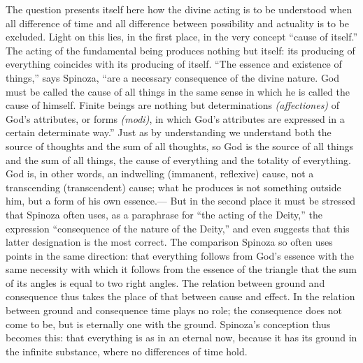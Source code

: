 \documentclass[12pt]{book}
\newcommand{\opage}[1]{\marginnote{\footnotesize\textit{[#1]}}}
\begin{document}
The question presents itself here how the divine acting is to be understood when all
difference of time and all difference between possibility and actuality is to be
excluded. Light on this lies, in the first place, in the very concept ``cause of
itself.'' The acting of the fundamental being produces nothing but itself: its
producing of everything coincides with its producing of itself. ``The essence and
existence of things,'' says Spinoza, ``are a necessary consequence of the divine nature.
God must be called the cause of all things in the same sense in which he is called the
cause of himself. Finite beings are nothing but determinations \textit{(affectiones)} of
God's attributes, or forms \textit{(modi)}, in which God's attributes are expressed in a
certain determinate way.'' Just as by understanding we understand both the source of
thoughts and the sum of all thoughts, so God is the source of all things and the sum of
all things, the cause of everything and the totality of everything. God is, in other
words, an indwelling (immanent, reflexive) cause, not a transcending (transcendent)
cause; what he produces is not something outside him, but a form of his own essence.---
But in the second place it must be stressed that Spinoza often uses, as a paraphrase
for ``the acting of the Deity,'' the expression ``consequence of the nature of the
Deity,'' and even suggests that this latter designation is the most correct. The
comparison Spinoza so often uses points in the same direction: that everything follows
from God's essence with the same necessity with which it follows from the essence of
the triangle that the sum of its angles is equal \opage{84}to two right angles. The
relation between ground and consequence thus takes the place of that between cause and
effect. In the relation between ground and consequence time plays no role; the
consequence does not come to be, but is eternally one with the ground. Spinoza's
conception thus becomes this: that everything is as in an eternal now, because it has
its ground in the infinite substance, where no differences of time hold.
\end{document}
